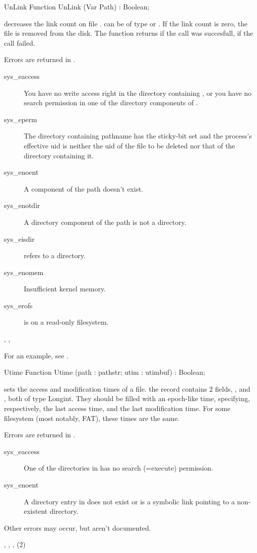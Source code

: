 \begin{function}{UnLink}
\Declaration
Function UnLink (Var Path) : Boolean;

\Description

 decreases the link count on file .  can be
of type  or . If the link count is zero, the
file is removed from the disk.
The function returns  if the call was succesfull,  if the call
failed.

\Errors
 Errors are returned in .
\begin{description}
\item[sys\_eaccess] You have no write access right in the directory
containing , or you have no search permission in one of the
directory components of .
\item[sys\_eperm] The  directory containing pathname has the sticky-bit 
set and the process's effective  uid is neither the uid of the 
file to be deleted nor that of the directory containing it.
\item[sys\_enoent] A component of the path doesn't exist.
\item[sys\_enotdir] A directory component of the path is not a directory.
\item[sys\_eisdir]  refers to a directory.
\item[sys\_enomem] Insufficient kernel memory.
\item[sys\_erofs]  is on a read-only filesystem. 
\end{description}

\SeeAlso
{}, ,  
\end{function}
For an example, see .
\begin{function}{Utime}
\Declaration
Function Utime (path : pathstr; utim : utimbuf) : Boolean;

\Description

 sets the access and modification times of a file.
the  record contains 2 fields, , and ,
both of type Longint. They should be filled with an epoch-like time,
specifying, respectively, the last access time, and the last modification
time. 
For some filesystem (most notably, FAT), these times are the same. 

\Errors
Errors are returned in .
\begin{description}
\item[sys\_eaccess] One of the directories in  has no
search (=execute) permission.
\item[sys\_enoent] A directory entry in  does
not exist or is a symbolic link pointing to a non-existent directory.
\end{description}
Other errors may occur, but aren't documented.

\SeeAlso
{}, , , (2)
\end{function}
